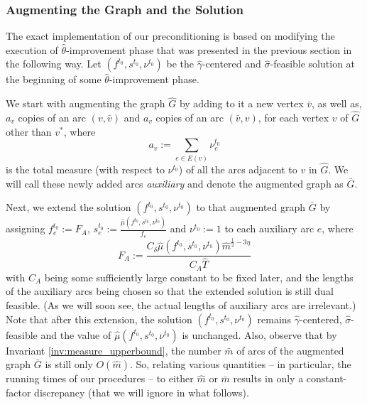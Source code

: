 \documentclass[11pt, letterpaper]{article}
\newcommand{\cdelta}{C_{\delta}}
\newcommand{\cauxiliary}{C_{A}}
\newcommand{\fauxiliary}{F_{A}}
\newcommand{\oG}{\bar{G}}
\newcommand{\hG}{\widehat{G}}
\newcommand{\hm}{\widehat{m}}
\newcommand{\om}{\bar{m}}
\newcommand{\hT}{\widehat{T}}
\newcommand{\ov}{\bar{v}}
\newcommand{\hmu}{\hat{\mu}}
\newcommand{\hgamma}{\hat{\gamma}}
\newcommand{\htheta}{\hat{\theta}}
\newcommand{\vnu}{\boldsymbol{\mathit{\nu}}}
\newcommand{\hvsigma}{\boldsymbol{\mathit{\hat{\sigma}}}}
\newcommand{\ff}{\boldsymbol{\mathit{f}}}
\renewcommand{\ss}{\boldsymbol{\mathit{s}}}
\begin{document}
\subsubsection*{Augmenting the Graph and the Solution}

The exact implementation of our preconditioning is based on modifying the execution of $\htheta$-improvement phase that was presented in the previous section in the following way. Let $(\ff^{t_0},\ss^{t_0},\vnu^{t_0})$ be the  $\hgamma$-centered and $\hvsigma$-feasible solution at the beginning of some $\htheta$-improvement phase. 

We start with augmenting the graph $\hG$ by adding to it a new vertex $\ov$, as well as, $a_v$ copies of an arc $(v,\ov)$ and $a_v$ copies of an arc $(\ov,v)$, for each vertex $v$ of $\hG$ other than $v^*$, where
\begin{equation}
\label{eq:def_of_a}
a_v:=\sum_{e\in E(v)} \nu_{e}^{t_0}
\end{equation}
is the total measure (with respect to $\vnu^{t_0}$) of all the arcs adjacent to $v$ in $\hG$. We will call these newly added arcs {\em auxiliary} and denote the augmented graph as $\oG$. 

Next, we extend the solution $(\ff^{t_0},\ss^{t_0},\vnu^{t_0})$ to that augmented graph $\oG$ by assigning $f_e^{t_0}:=\fauxiliary$, $s_e^{t_0}:=\frac{\hmu(\ff^{t_0},\ss^{t_0},\vnu^{t_0})}{f_e}$ and $\vnu^{t_0}:=1$ to each auxiliary arc $e$, where
\begin{equation}
\label{eq:def_of_fauxliary}
\fauxiliary:=\frac{\cdelta \hmu(\ff^{t_0},\ss^{t_0},\vnu^{t_0})\hm^{\frac{1}{2}-3\eta}}{\cauxiliary \hT}
\end{equation}
with $\cauxiliary$ being some sufficiently large constant to be fixed later, and the lengths of the auxiliary arcs being chosen so that the extended solution is still dual feasible. (As we will soon see, the actual lengths of auxiliary arcs are irrelevant.) Note that after this extension, the solution $(\ff^{t_0},\ss^{t_0},\vnu^{t_0})$ remains $\hgamma$-centered, $\hvsigma$-feasible and the value of $\hmu(\ff^{t_0},\ss^{t_0},\vnu^{t_0})$ is unchanged. Also, observe that by Invariant \ref{inv:measure_upperbound}, the number $\om$ of arcs of the augmented graph $\oG$ is still only $O(\hm)$. So, relating various quantities -- in particular, the running times of our procedures -- to either $\hm$ or $\om$ results in only a constant-factor discrepancy (that we will ignore in what follows).
\end{document}
